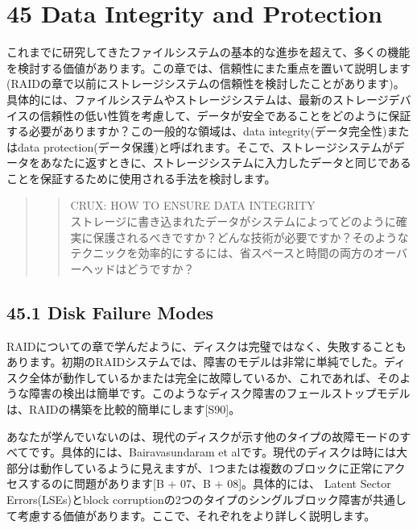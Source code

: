 \hypertarget{data-integrity-and-protection}{%
\section*{45 Data Integrity and
Protection}\label{data-integrity-and-protection}}

これまでに研究してきたファイルシステムの基本的な進歩を超えて、多くの機能を検討する価値があります。この章では、信頼性にまた重点を置いて説明します(RAIDの章で以前にストレージシステムの信頼性を検討したことがあります)。具体的には、ファイルシステムやストレージシステムは、最新のストレージデバイスの信頼性の低い性質を考慮して、データが安全であることをどのように保証する必要がありますか？この一般的な領域は、data
integrity(データ完全性)またはdata
protection(データ保護)と呼ばれます。そこで、ストレージシステムがデータをあなたに返すときに、ストレージシステムに入力したデータと同じであることを保証するために使用される手法を検討します。

\begin{quote}
\begin{quote}
CRUX: HOW TO ENSURE DATA INTEGRITY\\
ストレージに書き込まれたデータがシステムによってどのように確実に保護されるべきですか？どんな技術が必要ですか？そのようなテクニックを効率的にするには、省スペースと時間の両方のオーバーヘッドはどうですか？
\end{quote}
\end{quote}

\hypertarget{disk-failure-modes}{%
\subsection*{45.1 Disk Failure Modes}\label{disk-failure-modes}}

RAIDについての章で学んだように、ディスクは完璧ではなく、失敗することもあります。初期のRAIDシステムでは、障害のモデルは非常に単純でした。ディスク全体が動作しているかまたは完全に故障しているか、これであれば、そのような障害の検出は簡単です。このようなディスク障害のフェールストップモデルは、RAIDの構築を比較的簡単にします{[}S90{]}。

あなたが学んでいないのは、現代のディスクが示す他のタイプの故障モードのすべてです。具体的には、Bairavasundaram
et
alです。現代のディスクは時には大部分は動作しているように見えますが、1つまたは複数のブロックに正常にアクセスするのに問題があります{[}B
+ 07、B + 08{]}。具体的には、 Latent Sector Errors(LSEs)とblock
corruptionの2つのタイプのシングルブロック障害が共通して考慮する価値があります。ここで、それぞれをより詳しく説明します。

